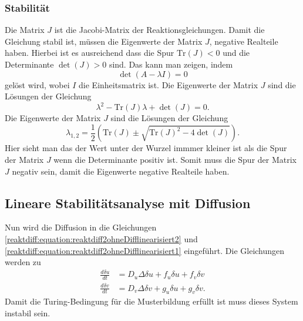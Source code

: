 \subsubsection{Stabilität}
Die Matrix \(J\) ist die Jacobi-Matrix der Reaktionsgleichungen.
Damit die Gleichung stabil ist, müssen die Eigenwerte der Matrix \(J\), negative Realteile haben.
Hierbei ist es ausreichend dass die Spur \(\text{Tr}(J) < 0\) und die Determinante \(\det(J) > 0\) sind.
Das kann man zeigen, indem
\begin{equation*}
    \det(A - \lambda I) = 0
\end{equation*}
gelöst wird, wobei \(I\) die Einheitsmatrix ist.
Die Eigenwerte der Matrix \(J\) sind die Lösungen der Gleichung
\begin{equation*}
    \lambda^2 - \text{Tr}(J) \lambda + \det(J) = 0.
\label{reaktdiff:equation:reaktdiff2ohneDifflinearisiert3}
\end{equation*}
Die Eigenwerte der Matrix \(J\) sind die Lösungen der Gleichung
\begin{equation*}
    \lambda_{1,2} = \frac{1}{2} \left( \text{Tr}(J) \pm 
    \sqrt{\text{Tr}(J)^2 - 4 \det(J)} \right).
\label{reaktdiff:equation:reaktdiff2ohneDifflinearisiert4}
\end{equation*}
Hier sieht man das der Wert unter der Wurzel immmer kleiner ist als die Spur der Matrix \(J\) wenn die Determinante positiv ist.
Somit muss die Spur der Matrix \(J\) negativ sein, damit die Eigenwerte negative Realteile haben.

\subsection{Lineare Stabilitätsanalyse mit Diffusion
\label{reaktdiff:section:matheDiff}}
Nun wird die Diffusion in die Gleichungen \ref{reaktdiff:equation:reaktdiff2ohneDifflinearisiert2} und \ref{reaktdiff:equation:reaktdiff2ohneDifflinearisiert1} eingeführt.
Die Gleichungen werden zu
\begin{align}
    \label{reaktdiff:equation:reaktdiff2mitDiff1}
    \frac{d \delta u}{dt} &= D_u \Delta \delta u + 
    f_u \delta u + f_v \delta v\\
    \label{reaktdiff:equation:reaktdiff2mitDiff2}
    \frac{d \delta v}{dt} &= D_v \Delta \delta v + 
    g_u \delta u + g_v \delta v.
\end{align}
Damit die Turing-Bedingung für die Musterbildung erfüllt ist muss dieses System instabil sein.

